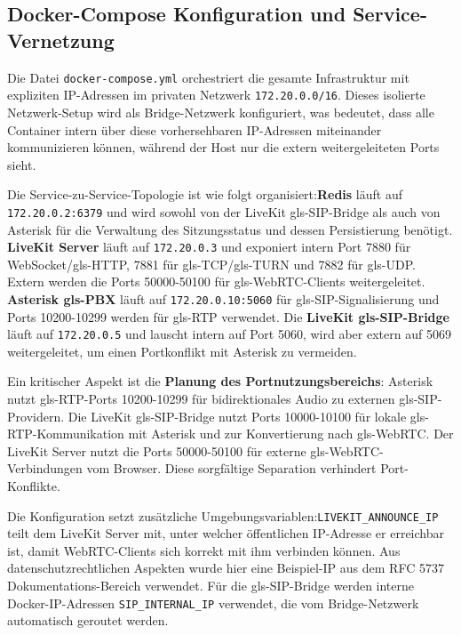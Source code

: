 \subsection{Docker-Compose Konfiguration und Service-Vernetzung}

 Die Datei \texttt{docker-compose.yml} orchestriert die gesamte Infrastruktur mit expliziten IP-Adressen im privaten Netzwerk \texttt{172.20.0.0/16}. Dieses isolierte Netzwerk-Setup wird als Bridge-Netzwerk konfiguriert, was bedeutet, dass alle Container intern über diese vorhersehbaren IP-Adressen miteinander kommunizieren können, während der Host nur die extern weitergeleiteten Ports sieht.

Die Service-zu-Service-Topologie ist wie folgt organisiert:\newline \textbf{Redis} läuft auf \texttt{172.20.0.2:6379} und wird sowohl von der LiveKit \gls{gls-SIP}-Bridge als auch von Asterisk für die Verwaltung des Sitzungsstatus und dessen Persistierung benötigt. \textbf{LiveKit Server} läuft auf \texttt{172.20.0.3} und exponiert intern Port 7880 für WebSocket/\gls{gls-HTTP}, 7881 für \gls{gls-TCP}/\gls{gls-TURN} und 7882 für \gls{gls-UDP}. Extern werden die Ports 50000-50100 für \gls{gls-WebRTC}-Clients weitergeleitet. \textbf{Asterisk \gls{gls-PBX}} läuft auf \texttt{172.20.0.10:5060} für \gls{gls-SIP}-Signalisierung und Ports 10200-10299 werden für \gls{gls-RTP} verwendet. Die \textbf{LiveKit \gls{gls-SIP}-Bridge} läuft auf \texttt{172.20.0.5} und lauscht intern auf Port 5060, wird aber extern auf 5069 weitergeleitet, um einen Portkonflikt mit Asterisk zu vermeiden.

Ein kritischer Aspekt ist die \textbf{Planung des Portnutzungsbereichs}: Asterisk nutzt \gls{gls-RTP}-Ports 10200-10299 für bidirektionales Audio zu externen \gls{gls-SIP}-Providern. Die LiveKit \gls{gls-SIP}-Bridge nutzt Ports 10000-10100 für lokale \gls{gls-RTP}-Kommunikation mit Asterisk und zur Konvertierung nach \gls{gls-WebRTC}. Der LiveKit Server nutzt die Ports 50000-50100 für externe \gls{gls-WebRTC}-Verbindungen vom Browser. Diese sorgfältige Separation verhindert Port-Konflikte.

Die Konfiguration setzt zusätzliche Umgebungsvariablen:\newline \texttt{LIVEKIT\_ANNOUNCE\_IP} teilt dem LiveKit Server mit, unter welcher öffentlichen IP-Adresse er erreichbar ist, damit WebRTC-Clients sich korrekt mit ihm verbinden können. Aus datenschutzrechtlichen Aspekten wurde hier eine Beispiel-IP aus dem RFC 5737 Dokumentations-Bereich verwendet. Für die \gls{gls-SIP}-Bridge werden interne Docker-IP-Adressen \texttt{SIP\_INTERNAL\_IP} verwendet, die vom Bridge-Netzwerk automatisch geroutet werden.

